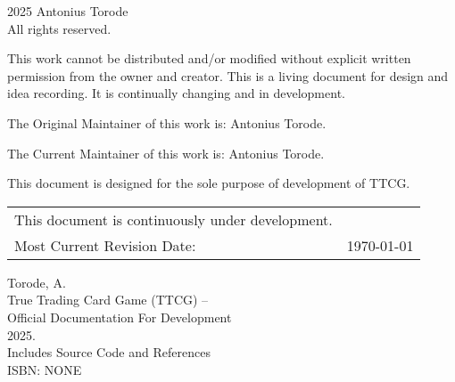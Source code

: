 \pagestyle{empty}
\begingroup
\footnotesize
\parindent 0pt
\parskip \baselineskip
\textcopyright{} 2025 Antonius Torode \\
All rights reserved.

This work cannot be distributed and/or modified without explicit written permission from the owner and creator. This is a living document for design and idea recording. It is continually changing and in development.

The Original Maintainer of this work is: Antonius Torode.

The Current Maintainer of this work is: Antonius Torode.

This document is designed for the sole purpose of development of TTCG.


\begin{center}
\begin{tabular}{ll}
This document is continuously under development. \\
Most Current Revision Date: &  \today 
\end{tabular}
\end{center}

\vfill

Torode, A.\\
\hspace*{2em} True Trading Card Game (TTCG) -- \\
\hspace*{2em} Official Documentation For Development \\
\hspace*{2em} 2025. \\
\hspace*{2em} Includes Source Code and References \\
\hspace*{2em} ISBN: NONE \\



\endgroup
\clearpage